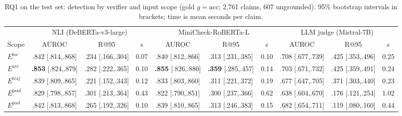 \documentclass[conference]{IEEEtran}
\newcommand{\Eloc}{E^{\mathrm{loc}}}
\newcommand{\Eacc}{E^{\mathrm{acc}}}
\newcommand{\Etraj}{E^{\mathrm{traj}}}
\newcommand{\Epool}{E^{\mathrm{pool}}}
\newcommand{\Epad}{E^{\mathrm{pad}}}
\begin{document}
\begin{table}[t]
\caption{RQ1 on the test set: detection by verifier and input scope (gold $g=\mathrm{acc}$; 2,761 claims, 607 ungrounded). 95\% bootstrap intervals in brackets; time is mean seconds per claim.}\label{tab:rq1}
\centering\footnotesize
\setlength{\tabcolsep}{4pt}
\begin{tabular}{@{}l ccc ccc ccc@{}}
\toprule
 & \multicolumn{3}{c}{NLI (DeBERTa-v3-large)} & \multicolumn{3}{c}{MiniCheck-RoBERTa-L} & \multicolumn{3}{c}{LLM judge (Mistral-7B)} \\
\cmidrule(lr){2-4}\cmidrule(lr){5-7}\cmidrule(l){8-10}
Scope & AUROC & R@95 & s & AUROC & R@95 & s & AUROC & R@95 & s \\
\midrule
$\Eloc$ & .842 {\tiny[.814,.868]} & .234 {\tiny[.166,.304]} & 0.07 & .840 {\tiny[.812,.866]} & .313 {\tiny[.231,.385]} & 0.10 & .708 {\tiny[.677,.739]} & .425 {\tiny[.353,.496]} & 0.25 \\
$\Eacc$ & \textbf{.853} {\tiny[.824,.879]} & .282 {\tiny[.222,.365]} & 0.10 & \textbf{.855} {\tiny[.826,.880]} & \textbf{.359} {\tiny[.285,.457]} & 0.14 & .703 {\tiny[.671,.732]} & .425 {\tiny[.359,.491]} & 0.24 \\
$\Etraj$ & .839 {\tiny[.809,.865]} & .221 {\tiny[.152,.343]} & 0.12 & .833 {\tiny[.803,.860]} & .311 {\tiny[.221,.372]} & 0.19 & .677 {\tiny[.647,.705]} & .371 {\tiny[.303,.440]} & 0.23 \\
$\Epool$ & .829 {\tiny[.798,.857]} & .301 {\tiny[.213,.364]} & 0.43 & .822 {\tiny[.790,.851]} & .300 {\tiny[.237,.366]} & 0.62 & .638 {\tiny[.604,.670]} & .176 {\tiny[.121,.254]} & 1.02 \\
$\Epad$ & .842 {\tiny[.813,.868]} & .265 {\tiny[.192,.326]} & 0.10 & .839 {\tiny[.810,.865]} & .313 {\tiny[.246,.383]} & 0.15 & .682 {\tiny[.654,.711]} & .119 {\tiny[.080,.160]} & 0.44 \\
\bottomrule
\end{tabular}
\end{table}
\end{document}
